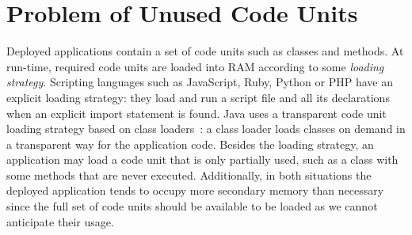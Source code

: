 

\section{Problem of Unused Code Units}\label{sec:problem}
Deployed applications contain a set of code units such as classes and methods.
At run-time, required code units are loaded into RAM according to some \emph{loading strategy}.
Scripting languages such as JavaScript, Ruby, Python or PHP have an explicit loading strategy: they load and run a script file and all its declarations when an explicit import statement is found. 
Java uses a transparent code unit loading strategy based on class loaders~\cite{Lian98a}: a class loader loads classes on demand in a transparent way for the application code.
Besides the loading strategy, an application may load a code unit that is only partially used, such as a class with some methods that are never executed.
Additionally, in both situations the deployed application tends to occupy more secondary memory than necessary since the full set of code units should be available to be loaded as we cannot anticipate their usage.


